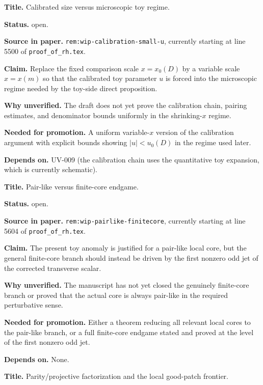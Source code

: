 \documentclass[11pt,a4paper]{amsart}
\begin{document}
\begin{description}[style=nextline,leftmargin=2.9cm,font=\normalfont\bfseries]

\item[UV-001]
\textbf{Title.} Calibrated size versus microscopic toy regime.

\textbf{Status.} open.

\textbf{Source in paper.} \texttt{rem:wip-calibration-small-u}, currently
starting at line 5500 of \texttt{proof\_of\_rh.tex}.

\textbf{Claim.} Replace the fixed comparison scale $x=x_0(D)$ by a variable
scale $x=x(m)$ so that the calibrated toy parameter $u$ is forced into the
microscopic regime needed by the toy-side direct proposition.

\textbf{Why unverified.} The draft does not yet prove the calibration chain,
pairing estimates, and denominator bounds uniformly in the shrinking-$x$
regime.

\textbf{Needed for promotion.} A uniform variable-$x$ version of the
calibration argument with explicit bounds showing $|u|<u_0(D)$ in the regime
used later.

\textbf{Depends on.} UV-009 (the calibration chain uses the quantitative
toy expansion, which is currently schematic).

\item[UV-002]
\textbf{Title.} Pair-like versus finite-core endgame.

\textbf{Status.} open.

\textbf{Source in paper.} \texttt{rem:wip-pairlike-finitecore}, currently
starting at line 5604 of \texttt{proof\_of\_rh.tex}.

\textbf{Claim.} The present toy anomaly is justified for a pair-like local core,
but the general finite-core branch should instead be driven by the first nonzero
odd jet of the corrected transverse scalar.

\textbf{Why unverified.} The manuscript has not yet closed the genuinely
finite-core branch or proved that the actual core is always pair-like in the
required perturbative sense.

\textbf{Needed for promotion.} Either a theorem reducing all relevant local
cores to the pair-like branch, or a full finite-core endgame stated and proved
at the level of the first nonzero odd jet.

\textbf{Depends on.} None.

\item[UV-003]
\textbf{Title.} Parity/projective factorization and the local good-patch
frontier.


\end{description}
\end{document}
